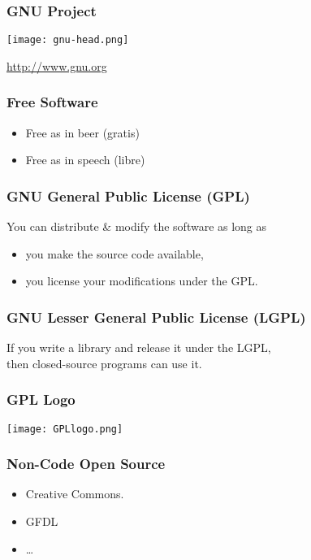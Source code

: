 \begin{frame}[fragile]
\frametitle{GNU Project}

\centering
\texttt{[image: gnu-head.png]}

\centering
\href{http://www.gnu.org/}{http://www.gnu.org}

%
\end{frame}


\begin{frame}[fragile]
\frametitle{Free Software}

\begin{itemize}
\item Free as in beer (gratis)
\item Free as in speech (libre)
\end{itemize}

\end{frame}

\begin{frame}[fragile]
\frametitle{GNU General Public License (GPL)}

You can distribute \& modify the software as long as
\begin{itemize}
\item you make the source code available,
\item you license your modifications under the GPL.
\end{itemize}
\end{frame}

\begin{frame}[fragile]
\frametitle{GNU Lesser General Public License (LGPL)}

If you write a library and release it under the LGPL,\\
then closed-source programs can use it.

\end{frame}


\begin{frame}[fragile]
\frametitle{GPL Logo}

\centering
\texttt{[image: GPLlogo.png]}

\end{frame}

\begin{frame}[fragile]
\frametitle{Non-Code Open Source}

\begin{itemize}
\item Creative Commons.
\item GFDL
\item \ldots
\end{itemize}
\end{frame}

